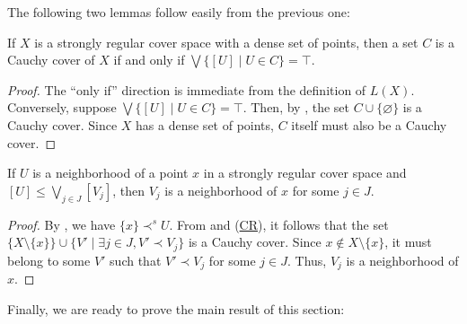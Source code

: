 \documentclass[reqno]{amsart}
\newcommand{\axref}[1]{(\hyperref[ax:#1]{#1})}
\theoremstyle{definition}
\theoremstyle{remark}
\numberwithin{figure}{section}
\newcommand{\rb}{\prec}
\begin{document}
The following two lemmas follow easily from the previous one:

\begin{lem}
If $X$ is a strongly regular cover space with a dense set of points, then a set $C$ is a Cauchy cover of $X$ if and only if $\bigvee \{ [U] \mid U \in C \} = \top$.
\end{lem}
\begin{proof}
The ``only if'' direction is immediate from the definition of $L(X)$.
Conversely, suppose $\bigvee \{ [U] \mid U \in C \} = \top$.
Then, by , the set $C \cup \{ \varnothing \}$ is a Cauchy cover.
Since $X$ has a dense set of points, $C$ itself must also be a Cauchy cover.
\end{proof}

\begin{lem}
If $U$ is a neighborhood of a point $x$ in a strongly regular cover space and $[U] \leq \bigvee_{j \in J} [V_j]$, then $V_j$ is a neighborhood of $x$ for some $j \in J$.
\end{lem}
\begin{proof}
By , we have $\{ x \} \rb^s U$.  
From  and \axref{CR}, it follows that the set $\{ X \setminus \{ x \} \} \cup \{ V' \mid \exists j \in J, V' \rb V_j \}$ is a Cauchy cover.
Since $x \notin X \setminus \{ x \}$, it must belong to some $V'$ such that $V' \rb V_j$ for some $j \in J$.
Thus, $V_j$ is a neighborhood of $x$.
\end{proof}

Finally, we are ready to prove the main result of this section:
\end{document}
